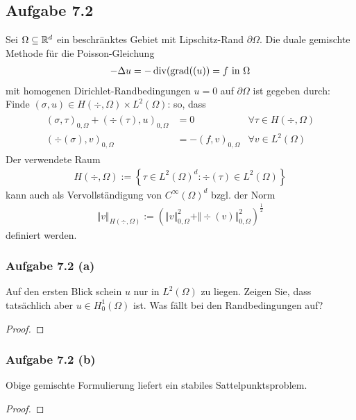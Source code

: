 \subsection{Aufgabe 7.2}
Sei $\Omega\subseteq\mathbb{R}^d$ ein beschränktes Gebiet mit Lipschitz-Rand $\partial\Omega$.
Die duale gemischte Methode für die Poisson-Gleichung 
\begin{align*}
	-\Delta u=-\operatorname{div}(\operatorname{grad}((u))=f\text{ in }\Omega
\end{align*}
mit homogenen Dirichlet-Randbedingungen $u=0$ auf $\partial\Omega$ ist gegeben durch:\nl
Finde $(\sigma,u)\in H(\div,\Omega)\times L^2(\Omega)$: so, dass
\begin{align*}
	\begin{array}{rll}
		(\sigma,\tau)_{0,\Omega}+(\div(\tau),u)_{0,\Omega}&=0&\forall\tau\in H(\div,\Omega)\\
		(\div(\sigma),v)_{0,\Omega} &=-(f,v)_{0,\Omega} &\forall v\in L^2(\Omega)
	\end{array}
\end{align*}
Der verwendete Raum
\begin{align*}
	H(\div,\Omega):=\left\lbrace\tau\in L^2(\Omega)^d:\div(\tau)\in L^2(\Omega)\right\rbrace
\end{align*}
kann auch als Vervollständigung von $C^\infty(\Omega)^d$ bzgl. der Norm 
\begin{align*}
	\Vert v\Vert_{H(\div,\Omega)}:=\left(\Vert v\Vert_{0,\Omega}^2+\Vert\div(v)\Vert_{0,\Omega}^2\right)^{\frac{1}{2}}
\end{align*}
definiert werden.

\subsubsection{Aufgabe 7.2 (a)}
Auf den ersten Blick schein $u$ nur in $L^2(\Omega)$ zu liegen.
Zeigen Sie, dass tatsächlich aber $u\in H_0^1(\Omega)$ ist.
Was fällt bei den Randbedingungen auf?

\begin{proof}
\end{proof}

\subsubsection{Aufgabe 7.2 (b)}
Obige gemischte Formulierung liefert ein stabiles Sattelpunktsproblem.

\begin{proof}
\end{proof}
